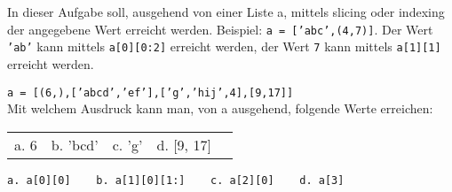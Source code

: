 \question[4]
In dieser Aufgabe soll, ausgehend von einer Liste a, mittels slicing oder
 indexing der angegebene Wert erreicht werden.
Beispiel: \texttt{a = ['abc',(4,7)]}.
 Der Wert \texttt{'ab'} kann mittels \texttt{a[0][0:2]} erreicht werden, der Wert 
\texttt{7} kann mittels \texttt{a[1][1]} erreicht werden.

\texttt{a = [(6,),['abcd','ef'],['g','hij',4],[9,17]]} \\
Mit welchem Ausdruck kann man, von a ausgehend, folgende Werte erreichen:  \\
\begin{tabular}{lllll}
a. 6 & b. 'bcd' & c. 'g' & d. [9, 17] \\
\end{tabular}
\begin{solutionbox}{1cm}
\texttt{a. a[0][0] ~~  b. a[1][0][1:] ~~ c. a[2][0] ~~ d. a[3]}
\end{solutionbox}
